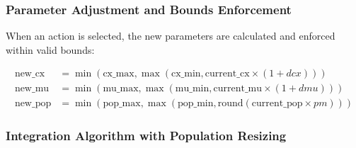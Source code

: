 \documentclass[12pt,a4paper]{article}
\begin{document}
\subsubsection{Parameter Adjustment and Bounds Enforcement}

When an action is selected, the new parameters are calculated and enforced within valid bounds:

\begin{equation}\label{Eq.parameter_adjustment}
\begin{aligned}
\text{new\_cx} &= \min(\text{cx\_max}, \max(\text{cx\_min}, \text{current\_cx} \times (1 + dcx))) \\
\text{new\_mu} &= \min(\text{mu\_max}, \max(\text{mu\_min}, \text{current\_mu} \times (1 + dmu))) \\
\text{new\_pop} &= \min(\text{pop\_max}, \max(\text{pop\_min}, \text{round}(\text{current\_pop} \times pm)))
\end{aligned}
\end{equation}

\subsubsection{Integration Algorithm with Population Resizing}
\end{document}

